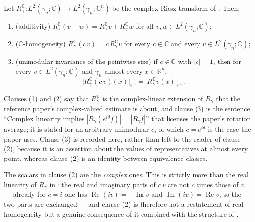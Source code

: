 \begin{lemma}
Let $R_\gamma^{\mathbb{C}} : L^2(\gamma_n;\mathbb{C}) \to L^2(\gamma_n;\mathbb{C}^n)$
be the complex Riesz transform of .  Then:
\begin{enumerate}
\item (additivity) $R_\gamma^{\mathbb{C}}(v + w)
  = R_\gamma^{\mathbb{C}} v + R_\gamma^{\mathbb{C}} w$ for all
  $v, w \in L^2(\gamma_n;\mathbb{C})$;
\item ($\mathbb{C}$-homogeneity) $R_\gamma^{\mathbb{C}}(c\,v)
  = c\,R_\gamma^{\mathbb{C}} v$ for every $c \in \mathbb{C}$ and every
  $v \in L^2(\gamma_n;\mathbb{C})$;
\item (unimodular invariance of the pointwise size) if $c \in \mathbb{C}$ with
  $|c| = 1$, then for every $v \in L^2(\gamma_n;\mathbb{C})$ and
  $\gamma_n$-almost every $x \in \mathbb{R}^n$,
\[
  \bigl|R_\gamma^{\mathbb{C}}(c\,v)(x)\bigr|_{\mathbb{C}^n}
    = \bigl|R_\gamma^{\mathbb{C}} v(x)\bigr|_{\mathbb{C}^n} .
\]
\end{enumerate}
Clauses (1) and (2) say that $R_\gamma^{\mathbb{C}}$ is the complex-linear
extension of $R_\gamma$ that the reference paper's complex-valued estimate is
about, and clause (3) is the sentence ``Complex linearity implies
$|R_\gamma(e^{i\theta}f)| = |R_\gamma f|$'' that licenses the paper's rotation
average; it is stated for an arbitrary unimodular $c$, of which $c = e^{i\theta}$
is the case the paper uses.  Clause (3) is recorded here, rather than left to
the reader of clause (2), because it is an assertion about the values of
representatives at almost every point, whereas clause (2) is an identity between
equivalence classes.

The scalars in clause (2) are the \emph{complex} ones.  This is strictly more
than the real linearity of $R_\gamma$ in : the
real and imaginary parts of $c\,v$ are not $c$ times those of $v$ --- already for
$c = i$ one has $\operatorname{Re}(iv) = -\operatorname{Im} v$ and
$\operatorname{Im}(iv) = \operatorname{Re} v$, so the two parts are exchanged ---
and clause (2) is therefore not a restatement of real homogeneity but a genuine
consequence of it combined with the structure of
.
\end{lemma}
